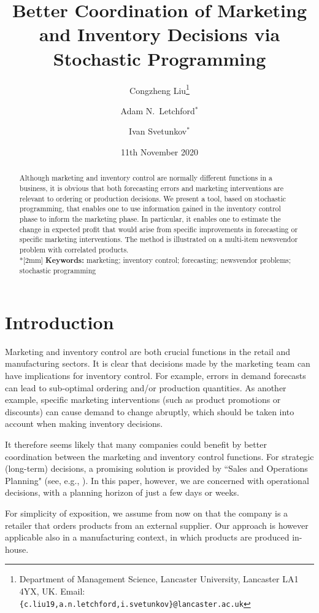 \documentclass[a4paper,11pt]{article}
\title{Better Coordination of Marketing and Inventory Decisions via
Stochastic Programming}
\author{Congzheng Liu\thanks{Department of Management Science,
Lancaster University, Lancaster LA1 4YX, UK.
Email: {\tt \{c.liu19,a.n.letchford,i.svetunkov\}@lancaster.ac.uk}}
\and Adam N.\ Letchford$^*$ \and Ivan Svetunkov$^*$} %
\date{11th November 2020}
\begin{document}
\maketitle

\begin{abstract}
Although marketing and inventory control are normally different functions
in a business, it is obvious that both forecasting errors and marketing
interventions are relevant to ordering or production decisions. We present
a tool, based on stochastic programming, that enables one to use
information gained in the inventory control phase to inform the marketing
phase. In particular, it enables one to estimate the change in expected
profit that would arise from specific improvements in forecasting or
specific marketing interventions. The method is illustrated on a
multi-item newsvendor problem with correlated products.
\\*[2mm]
{\bf Keywords:} marketing; inventory control; forecasting; newsvendor problems; stochastic programming
\end{abstract}

\section{Introduction}

Marketing and inventory control are both crucial functions in the retail
and manufacturing sectors. It is clear that decisions made by the
marketing team can have implications for inventory control. For example,
errors in demand forecasts can lead to sub-optimal ordering and/or
production quantities. As another example, specific marketing interventions
(such as product promotions or discounts) can cause demand to change
abruptly, which should be taken into account when making inventory
decisions.

It therefore seems likely that many companies could benefit by better
coordination between the marketing and inventory control functions. For
strategic (long-term) decisions, a promising solution is provided by
``Sales and Operations Planning" (see, e.g., \cite{KS14,Th12}). In this
paper, however, we are concerned with operational decisions, with a
planning horizon of just a few days or weeks.

For simplicity of exposition, we assume from now on that the company is a retailer that orders products from an external supplier. Our approach
is however applicable also in a manufacturing context, in which products
are produced in-house.
\end{document}
